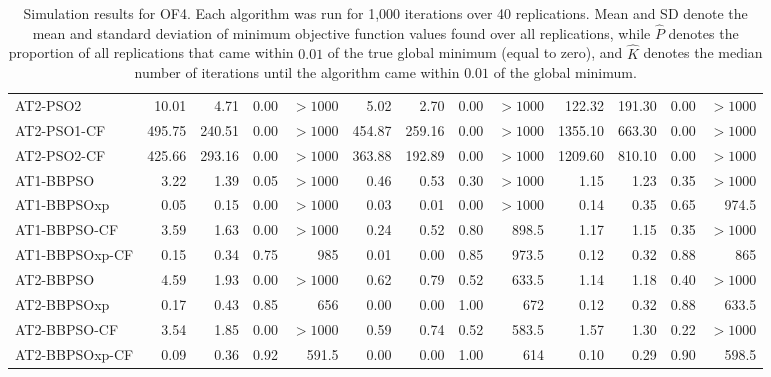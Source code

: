 \documentclass[cmbright]{staauth}
\numberwithin{table}{section}
\begin{document}
\begin{table}[ht]
\begin{tabular}{l|rrrr|rrrr|rrrr}
  AT2-PSO2 & 10.01 & 4.71 & 0.00 & $> 1000$ & 5.02 & 2.70 & 0.00 & $> 1000$ & 122.32 & 191.30 & 0.00 & $> 1000$ \\
  AT2-PSO1-CF & 495.75 & 240.51 & 0.00 & $> 1000$ & 454.87 & 259.16 & 0.00 & $> 1000$ & 1355.10 & 663.30 & 0.00 & $> 1000$ \\
  AT2-PSO2-CF & 425.66 & 293.16 & 0.00 & $> 1000$ & 363.88 & 192.89 & 0.00 & $> 1000$ & 1209.60 & 810.10 & 0.00 & $> 1000$ \\
   \hline
AT1-BBPSO & 3.22 & 1.39 & 0.05 & $> 1000$ & 0.46 & 0.53 & 0.30 & $> 1000$ & 1.15 & 1.23 & 0.35 & $> 1000$ \\
  AT1-BBPSOxp & 0.05 & 0.15 & 0.00 & $> 1000$ & 0.03 & 0.01 & 0.00 & $> 1000$ & 0.14 & 0.35 & 0.65 & 974.5 \\
  AT1-BBPSO-CF & 3.59 & 1.63 & 0.00 & $> 1000$ & 0.24 & 0.52 & 0.80 & 898.5 & 1.17 & 1.15 & 0.35 & $> 1000$ \\
  AT1-BBPSOxp-CF & 0.15 & 0.34 & 0.75 & 985 & 0.01 & 0.00 & 0.85 & 973.5 & 0.12 & 0.32 & 0.88 & 865 \\
   \hline
AT2-BBPSO & 4.59 & 1.93 & 0.00 & $> 1000$ & 0.62 & 0.79 & 0.52 & 633.5 & 1.14 & 1.18 & 0.40 & $> 1000$ \\
  AT2-BBPSOxp & 0.17 & 0.43 & 0.85 & 656 & 0.00 & 0.00 & 1.00 & 672 & 0.12 & 0.32 & 0.88 & 633.5 \\
  AT2-BBPSO-CF & 3.54 & 1.85 & 0.00 & $> 1000$ & 0.59 & 0.74 & 0.52 & 583.5 & 1.57 & 1.30 & 0.22 & $> 1000$ \\
  AT2-BBPSOxp-CF & 0.09 & 0.36 & 0.92 & 591.5 & 0.00 & 0.00 & 1.00 & 614 & 0.10 & 0.29 & 0.90 & 598.5 \\
   \hline
\end{tabular}
\endgroup
\caption{Simulation results for OF4. Each algorithm was run for 1,000 iterations over 40 replications. Mean and SD denote the mean and standard deviation of minimum objective function values found over all replications, while $\widehat{P}$ denotes the proportion of all replications that came within $0.01$ of the true global minimum (equal to zero), and $\widehat{K}$ denotes the median number of iterations until the algorithm came within $0.01$ of the global minimum.}
\label{tab:psosim4}
\end{table}
\end{document}
